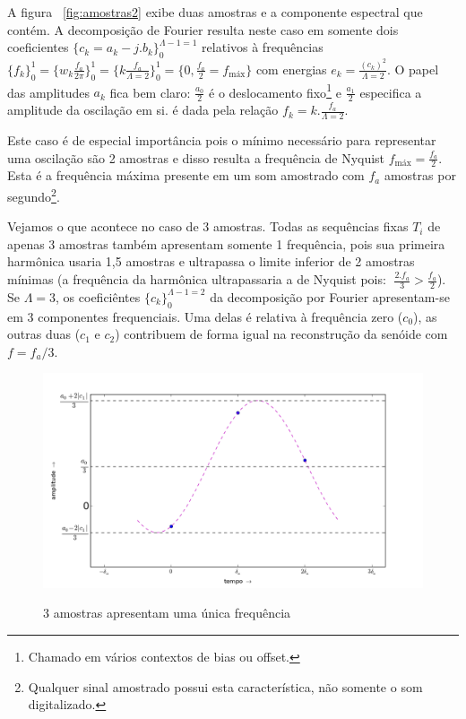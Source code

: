 A figura ~\ref{fig:amostras2} exibe duas amostras e a componente espectral que contém. A decomposição de Fourier resulta neste caso em somente dois coeficientes $\{c_k=a_k-j.b_k\}_0^{\Lambda-1=1}$ relativos à frequências $\{f_k\}_0^1=\{w_k\frac{f_a}{2\pi}\}_0^1=\{k\frac{f_a}{\Lambda=2}\}_0^1=\{0,\frac{f_a}{2}=f_{\text{máx}}\}$
com energias $e_k=\frac{(c_k)^2}{\Lambda=2}$. O papel das amplitudes $a_k$ fica bem claro:
 $\frac{a_0}{2}$ é o deslocamento fixo\footnote{Chamado em vários contextos de bias ou offset.} e $\frac{a_1}{2}$ especifica a amplitude da oscilação em si.
  é dada pela relação $f_k=k . \frac{f_a}{\Lambda=2}$.

Este caso é de especial importância pois o mínimo necessário para representar uma oscilação são 2 amostras e disso resulta a frequência de Nyquist $f_{\text{máx}}=\frac{f_a}{2}$. Esta é a frequência máxima presente em um som amostrado com $f_a$ amostras por segundo\footnote{Qualquer sinal amostrado possui esta característica, não somente o som digitalizado.}.

Vejamos o que acontece no caso de 3 amostras. Todas as sequências fixas $T_i$ de apenas 3 amostras também apresentam
somente 1 frequência, pois sua primeira harmônica usaria 1,5 amostras e ultrapassa o limite inferior de 2 amostras mínimas (a frequência da harmônica ultrapassaria a de Nyquist pois:  $\; \frac{2. f_a}{3} > \frac{f_a}{2} $). Se $\Lambda=3$, 
os coeficiêntes $\{c_k\}_0^{\Lambda-1=2}$ da decomposição por Fourier apresentam-se em 
3 componentes frequenciais. Uma delas é relativa à frequência zero ($c_0$), as outras duas ($c_1$ e $c_2$) contribuem de forma igual na reconstrução da senóide com $f=f_a/3$.

\begin{figure}[h!]
    \centering
    \caption{3 amostras apresentam uma única frequência}
        \includegraphics[width=\textwidth]{figuras/amostras3b}
        \label{fig:amostras3}
\end{figure}



